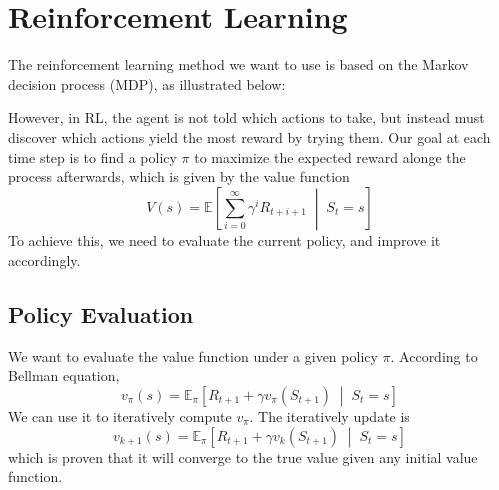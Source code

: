 \documentclass[11pt]{article}
\begin{document}
\section{Reinforcement Learning}
The reinforcement learning method we want to use is based on the Markov 
decision process (MDP), as illustrated below:
\begin{center}
    
\end{center}
\noindent However, in RL, the agent is not told which actions to take, but 
instead must discover which actions yield the most reward by trying them. Our 
goal at each time step is to find a policy \(\pi\) to maximize the expected 
reward alonge the process afterwards, which is given by the value function
\[V(s)=\mathbb{E}\left[\sum_{i=0}^{\infty} \gamma^i R_{t+i+1}\;\middle|\; 
S_t=s\right]\]
To achieve this, we need to evaluate the current policy, and improve it 
accordingly.

\subsection{Policy Evaluation}
We want to evaluate the value function under a given policy \(\pi\). According 
to Bellman equation,
\[v_\pi(s)=\mathbb{E}_\pi\left[R_{t+1}+\gamma v_\pi(S_{t+1})\;\middle|\;
S_t=s\right]\]
We can use it to iteratively compute \(v_\pi\). The iteratively update is
\[v_{k+1}(s)=\mathbb{E}_\pi\left[R_{t+1}+\gamma v_k(S_{t+1})\;\middle|\;
S_t=s\right]\]
which is proven that it will converge to the true value given any initial value 
function.
\end{document}
